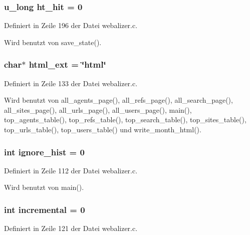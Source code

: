\subsubsection{\setlength{\rightskip}{0pt plus 5cm}u\_\-long {\bf ht\_\-hit} = 0}\label{webalizer_8c_14a295f77051b0898135267236453dd6}




Definiert in Zeile 196 der Datei webalizer.c.

Wird benutzt von save\_\-state().
\subsubsection{\setlength{\rightskip}{0pt plus 5cm}char$\ast$ {\bf html\_\-ext} = \char`\"{}html\char`\"{}}\label{webalizer_8c_ef5a49b05e1bff557f85797e61dcd23a}




Definiert in Zeile 133 der Datei webalizer.c.

Wird benutzt von all\_\-agents\_\-page(), all\_\-refs\_\-page(), all\_\-search\_\-page(), all\_\-sites\_\-page(), all\_\-urls\_\-page(), all\_\-users\_\-page(), main(), top\_\-agents\_\-table(), top\_\-refs\_\-table(), top\_\-search\_\-table(), top\_\-sites\_\-table(), top\_\-urls\_\-table(), top\_\-users\_\-table() und write\_\-month\_\-html().
\subsubsection{\setlength{\rightskip}{0pt plus 5cm}int {\bf ignore\_\-hist} = 0}\label{webalizer_8c_9c25fea667217c12ecade9cfac496daa}




Definiert in Zeile 112 der Datei webalizer.c.

Wird benutzt von main().
\subsubsection{\setlength{\rightskip}{0pt plus 5cm}int {\bf incremental} = 0}\label{webalizer_8c_534a10f9409e025831882efe4a58f959}




Definiert in Zeile 121 der Datei webalizer.c.

